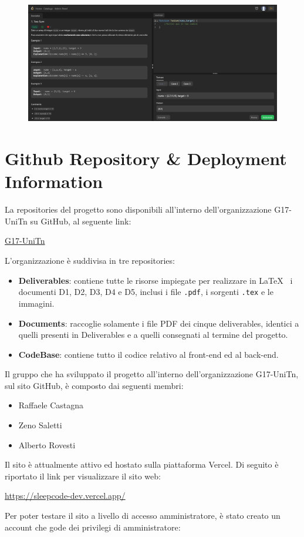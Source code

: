\documentclass[11pt, a4paper]{article}
\theoremstyle{definition}
\begin{document}
\begin{figure}[H]
  \centering
  \includegraphics[width=\textwidth]{materiale/sito/Problema.png}
\end{figure}

\newpage
\section{Github Repository \& Deployment Information}
La repositories del progetto sono disponibili all'interno dell'organizzazione
G17-UniTn su GitHub, al seguente link:
\begin{center}
  \href{https://github.com/G17-UniTn}{G17-UniTn}
\end{center}
L'organizzazione è suddivisa in tre repositories:
\begin{itemize}
  \item \textbf{Deliverables}: contiene tutte le risorse impiegate per realizzare in \LaTeX\texttt{ } i documenti D1, D2, D3, D4 e D5, inclusi i file \texttt{.pdf}, i sorgenti \texttt{.tex} e le immagini.
  \item \textbf{Documents}: raccoglie solamente i file PDF dei cinque deliverables, identici a quelli presenti in Deliverables e a quelli consegnati al termine del progetto.
  \item \textbf{CodeBase}: contiene tutto il codice relativo al front-end ed al back-end.
\end{itemize}
Il gruppo che ha sviluppato il progetto all'interno dell'organizzazione G17-UniTn, sul sito GitHub, è composto dai seguenti membri:
\begin{itemize}
  \item Raffaele Castagna \href{https://github.com/Raffaele-Castagna}{\textcolor{black}{\faGithub}}
  \item Zeno Saletti \href{https://github.com/zenosalty}{\textcolor{black}{\faGithub}}
  \item Alberto Rovesti \href{https://github.com/uniBeto}{\textcolor{black}{\faGithub}}
\end{itemize}
Il sito è attualmente attivo ed hostato sulla piattaforma Vercel. Di seguito è riportato il link per visualizzare il sito web:
\begin{center}
  \url{https://sleepcode-dev.vercel.app/}
\end{center}
Per poter testare il sito a livello di accesso amministratore, è stato creato un account che gode dei privilegi di amministratore:
\end{document}
